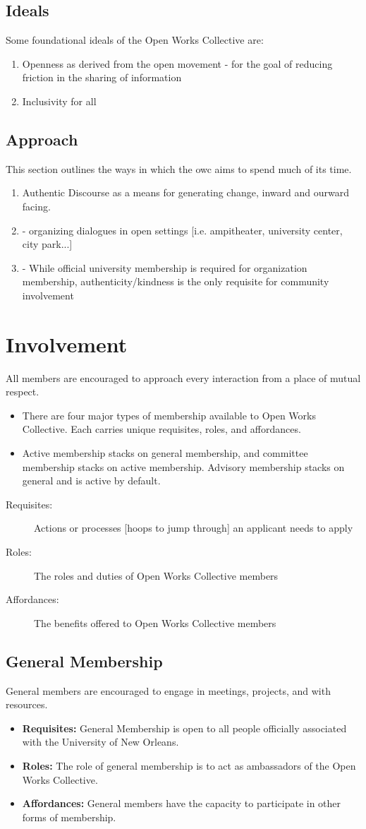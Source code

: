 \documentclass{article}
\newcommand{\article}[1]{\section{#1} \label{#1}}
\newcommand{\asection}[1]{\subsection{#1} \label{#1}}
\begin{document}
\asection{Ideals}
Some foundational ideals of the Open Works Collective are:
\begin{enumerate}
	\item Openness as derived from the open movement - for the goal of reducing friction in the sharing of information
	\item Inclusivity for all
\end{enumerate}

\asection{Approach}
This section outlines the ways in which the owc aims to spend much of its time. %
\begin{enumerate}
    \item Authentic Discourse as a means for generating change, inward and ourward facing. 
    \item - organizing dialogues in open settings [i.e. ampitheater, university center, city park...]
	\item - While official university membership is required for organization membership, authenticity/kindness is the only requisite for community involvement
\end{enumerate}

%
%
\article{Involvement}
All members are encouraged to approach every interaction from a place of mutual respect.
\begin{itemize}
    \item There are four major types of membership available to Open Works Collective.
Each carries unique requisites, roles, and affordances.
    \item Active membership stacks on general membership, and committee membership stacks on active membership.
Advisory membership stacks on general and is active by default.
\end{itemize}

\begin{description}
    \item[Requisites:] Actions or processes [hoops to jump through] an applicant needs to apply
	\item[Roles:] The roles and duties of Open Works Collective members
	\item[Affordances:] The benefits offered to Open Works Collective members
\end{description}

\asection{General Membership}
General members are encouraged to engage in meetings, projects, and with resources.
\begin{itemize}
	\item \textbf{Requisites:}  General Membership is open to all people officially associated with the University of New Orleans.
	\item \textbf{Roles:} The role of general membership is to act as ambassadors of the Open Works Collective.
	\item \textbf{Affordances:} General members have the capacity to participate in other forms of membership.
\end{itemize}
\end{document}

